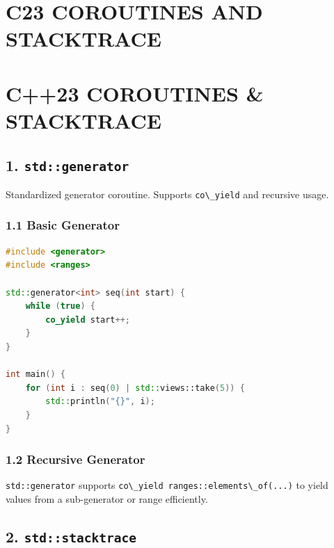\hypertarget{c23-coroutines-and-stacktrace}{%
\chapter{C23 COROUTINES AND
STACKTRACE}\label{c23-coroutines-and-stacktrace}}

\hypertarget{c23-coroutines-stacktrace}{%
\chapter{C++23 COROUTINES \&
STACKTRACE}\label{c23-coroutines-stacktrace}}

\hypertarget{stdgenerator}{%
\section{\texorpdfstring{1.
\texttt{std::generator}}{1. std::generator}}\label{stdgenerator}}

Standardized generator coroutine. Supports
\passthrough{\lstinline!co\_yield!} and recursive usage.

\hypertarget{basic-generator}{%
\subsection{1.1 Basic Generator}\label{basic-generator}}

\begin{lstlisting}[language={C++}]
#include <generator>
#include <ranges>

std::generator<int> seq(int start) {
    while (true) {
        co_yield start++;
    }
}

int main() {
    for (int i : seq(0) | std::views::take(5)) {
        std::println("{}", i);
    }
}
\end{lstlisting}

\hypertarget{recursive-generator}{%
\subsection{1.2 Recursive Generator}\label{recursive-generator}}

\passthrough{\lstinline!std::generator!} supports
\passthrough{\lstinline!co\_yield ranges::elements\_of(...)!} to yield
values from a sub-generator or range efficiently.

\hypertarget{stdstacktrace}{%
\section{\texorpdfstring{2.
\texttt{std::stacktrace}}{2. std::stacktrace}}\label{stdstacktrace}}

